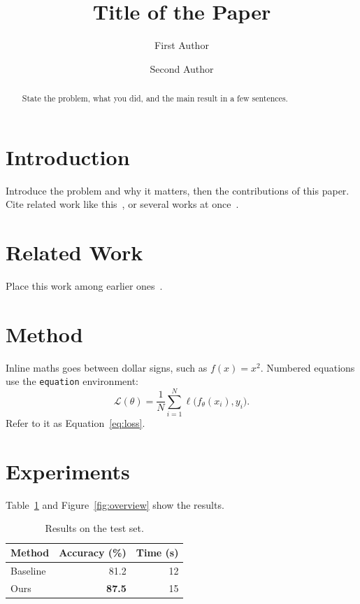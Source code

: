 \documentclass[runningheads]{llncs}
\begin{document}
\title{Title of the Paper}
\author{First Author \and
Second Author}

\maketitle

\begin{abstract}
State the problem, what you did, and the main result in a few sentences.

\end{abstract}

\section{Introduction}
\label{sec:intro}
Introduce the problem and why it matters, then the contributions of this
paper. Cite related work like this~\cite{he2016deep}, or several works at
once~\cite{vaswani2017attention,he2016deep}.

\section{Related Work}
Place this work among earlier ones~\cite{knuth1984,lamport1994}.

\section{Method}
\label{sec:method}
Inline maths goes between dollar signs, such as $f(x) = x^2$. Numbered
equations use the \texttt{equation} environment:
\begin{equation}
  \label{eq:loss}
  \mathcal{L}(\theta) = \frac{1}{N} \sum_{i=1}^{N} \ell\bigl(f_\theta(x_i), y_i\bigr).
\end{equation}
Refer to it as Equation~\eqref{eq:loss}.

\section{Experiments}
\label{sec:experiments}
Table~\ref{tab:results} and Figure~\ref{fig:overview} show the results.

\begin{table}[htbp]
  \centering
  \caption{Results on the test set.}
  \label{tab:results}
  \begin{tabular}{lrr}
    \toprule
    Method & Accuracy (\%) & Time (s) \\
    \midrule
    Baseline & 81.2 & 12 \\
    Ours     & \textbf{87.5} & 15 \\
    \bottomrule
  \end{tabular}
\end{table}
\end{document}
